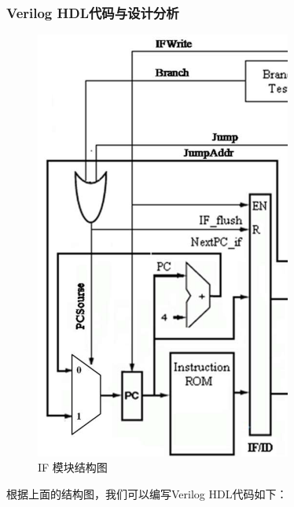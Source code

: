 \documentclass[12pt,hyperref,a4paper,UTF8]{ctexart}
\begin{document}
\newpage


\subsubsection*{\Large Verilog HDL代码与设计分析}
\normalsize
     \begin{figure}[H]
        \centering
        \includegraphics[width=0.75\textwidth]{figures/fig/image15.png}
        \caption{IF 模块结构图}
    \end{figure}

    根据上面的结构图，我们可以编写Verilog HDL代码如下：
\end{document}
